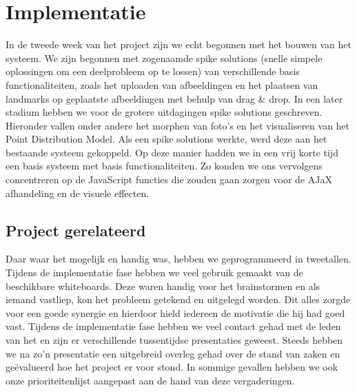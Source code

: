 \section{Implementatie}
\label{Implementatie}
In de tweede week van het project zijn we echt begonnen met het bouwen van het systeem. 
We zijn begonnen met zogenaamde spike solutions (snelle simpele oplossingen om een deelprobleem op te lossen) van verschillende basis functionaliteiten, zoals het uploaden van afbeeldingen en het plaatsen van landmarks op geplaatste afbeeldingen met behulp van drag \& drop. 
In een later stadium hebben we voor de grotere uitdagingen spike solutions geschreven.
Hieronder vallen onder andere het morphen van foto's en het visualiseren van het Point Distribution Model. 
Als een spike solutions werkte, werd deze aan het bestaande systeem gekoppeld.
Op deze manier hadden we in een vrij korte tijd een basis systeem met basis functionaliteiten. 
Zo konden we ons vervolgens concentreren op de JavaScript functies die zouden gaan zorgen voor de AJaX afhandeling en de visuele effecten.

\subsection{Project gerelateerd}
\label{implementatie_project_gerelateerd}
Daar waar het mogelijk en handig was, hebben we geprogrammeerd in tweetallen. 
Tijdens de implementatie fase hebben we veel gebruik gemaakt van de beschikbare whiteboards.
Deze waren handig voor het brainstormen en als iemand vastliep, kon het probleem getekend en uitgelegd worden. 
Dit alles zorgde voor een goede synergie en hierdoor hield iedereen de motivatie die hij had goed vast.
Tijdens de implementatie fase hebben we veel contact gehad met de leden van het \casamproject en zijn er verschillende tussentijdse presentaties geweest. 
Steeds hebben we na zo'n presentatie een uitgebreid overleg gehad over de stand van zaken en ge\"{e}valueerd  hoe het project er voor stond. In sommige gevallen hebben we ook onze prioriteitenlijst aangepast aan de hand van deze vergaderingen.

